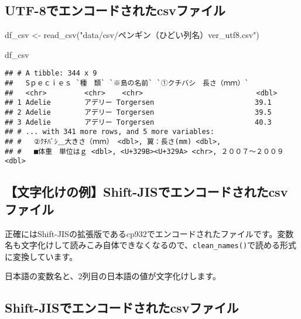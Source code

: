 \documentclass[
  xelatex,ja=standard, b5paper]{bxjsbook}
\newenvironment{Shaded}{\begin{snugshade}}{\end{snugshade}}
\newcommand{\FunctionTok}[1]{\textcolor[rgb]{0.00,0.00,0.00}{#1}}
\newcommand{\NormalTok}[1]{#1}
\newcommand{\OtherTok}[1]{\textcolor[rgb]{0.56,0.35,0.01}{#1}}
\newcommand{\StringTok}[1]{\textcolor[rgb]{0.31,0.60,0.02}{#1}}
\begin{document}
\hypertarget{utf-8ux3067ux30a8ux30f3ux30b3ux30fcux30c9ux3055ux308cux305fcsvux30d5ux30a1ux30a4ux30eb}{%
\subsection{UTF-8でエンコードされたcsvファイル}\label{utf-8ux3067ux30a8ux30f3ux30b3ux30fcux30c9ux3055ux308cux305fcsvux30d5ux30a1ux30a4ux30eb}}

\begin{Shaded}
\begin{Highlighting}[]
\NormalTok{df\_csv }\OtherTok{\textless{}{-}} 
 \FunctionTok{read\_csv}\NormalTok{(}\StringTok{"data/csv/ペンギン（ひどい列名）ver\_utf8.csv"}\NormalTok{)}

\NormalTok{df\_csv}
\end{Highlighting}
\end{Shaded}

\begin{verbatim}
## # A tibble: 344 x 9
##   Sｐｅｃｉｅｓ `種　類` `※島の名前` `①クチバシ　長さ（ｍｍ）`
##   <chr>         <chr>    <chr>                           <dbl>
## 1 Adelie        アデリー Torgersen                        39.1
## 2 Adelie        アデリー Torgersen                        39.5
## 3 Adelie        アデリー Torgersen                        40.3
## # ... with 341 more rows, and 5 more variables:
## #   ②ｸﾁﾊﾞｼ＿大きさ（ｍｍ） <dbl>, 翼：長さ(mm) <dbl>,
## #   ■体重　単位はｇ <dbl>, <U+329B><U+329A> <chr>, ２００７～２００９ <dbl>
\end{verbatim}

\hypertarget{ux6587ux5b57ux5316ux3051ux306eux4f8bshift-jisux3067ux30a8ux30f3ux30b3ux30fcux30c9ux3055ux308cux305fcsvux30d5ux30a1ux30a4ux30eb}{%
\subsection{【文字化けの例】Shift-JISでエンコードされたcsvファイル}\label{ux6587ux5b57ux5316ux3051ux306eux4f8bshift-jisux3067ux30a8ux30f3ux30b3ux30fcux30c9ux3055ux308cux305fcsvux30d5ux30a1ux30a4ux30eb}}

正確にはShift-JISの拡張版であるcp932でエンコードされたファイルです。変数名も文字化けして読みこみ自体できなくなるので、\texttt{clean\_names()}で読める形式に変換しています。

日本語の変数名と、2列目の日本語の値が文字化けします。

\hypertarget{shift-jisux3067ux30a8ux30f3ux30b3ux30fcux30c9ux3055ux308cux305fcsvux30d5ux30a1ux30a4ux30eb}{%
\subsection{Shift-JISでエンコードされたcsvファイル}\label{shift-jisux3067ux30a8ux30f3ux30b3ux30fcux30c9ux3055ux308cux305fcsvux30d5ux30a1ux30a4ux30eb}}
\end{document}

